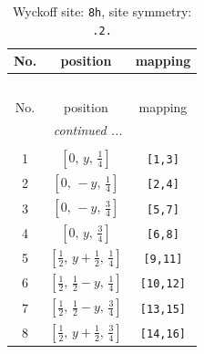\documentclass[fleqn,8pt]{jsarticle}
\begin{document}
\begin{longtable}{ccc}
\caption{Wyckoff site: {\tt 8h}, site symmetry: {\tt .2.}}
 \\
 \hline \hline
No. & position & mapping \\ \hline \endfirsthead

\multicolumn{2}{l}{\tablename\ \thetable{}} \\
 \hline \hline
No. & position & mapping \\ \hline \endhead

 \hline \hline
\multicolumn{2}{r}{\footnotesize\it continued ...} \\ \endfoot

 \hline \hline
\multicolumn{2}{r}{} \\ \endlastfoot

1 & $\left[ 0,\, y,\, \frac{1}{4} \right]$ & {\tt [1,3]} \\ \hline
2 & $\left[ 0,\, - y,\, \frac{1}{4} \right]$ & {\tt [2,4]} \\ \hline
3 & $\left[ 0,\, - y,\, \frac{3}{4} \right]$ & {\tt [5,7]} \\ \hline
4 & $\left[ 0,\, y,\, \frac{3}{4} \right]$ & {\tt [6,8]} \\ \hline
5 & $\left[ \frac{1}{2},\, y + \frac{1}{2},\, \frac{1}{4} \right]$ & {\tt [9,11]} \\ \hline
6 & $\left[ \frac{1}{2},\, \frac{1}{2} - y,\, \frac{1}{4} \right]$ & {\tt [10,12]} \\ \hline
7 & $\left[ \frac{1}{2},\, \frac{1}{2} - y,\, \frac{3}{4} \right]$ & {\tt [13,15]} \\ \hline
8 & $\left[ \frac{1}{2},\, y + \frac{1}{2},\, \frac{3}{4} \right]$ & {\tt [14,16]} \\
\end{longtable}
\renewcommand{\arraystretch}{1.2}
\end{document}
